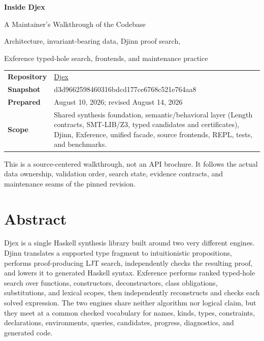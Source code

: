 \documentclass[10pt,letterpaper,oneside]{report}
\newcommand{\commitid}[1]{{\ttfamily\footnotesize #1}}
\newcommand{\RepoDjex}{\href{https://github.com/VladimirReshetnikov/Djex}{Djex}}
\begin{document}
\hypersetup{pageanchor=false}
\begin{titlepage}
\centering
\vspace*{0.8in}
{\Huge\bfseries\color{Ink} Inside Djex\par}
\vspace{0.25in}
{\LARGE\color{DeepBlue} A Maintainer's Walkthrough of the Codebase\par}
\vspace{0.2in}
{\large Architecture, invariant-bearing data, Djinn proof search,\par
Exference typed-hole search, frontends, and maintenance practice\par}
\vspace{0.8in}
\begin{tcolorbox}[width=0.86\textwidth,colback=SoftGray,colframe=RuleGray,boxrule=0.7pt,arc=1mm]
\small
\begin{tabularx}{\textwidth}{@{}L{0.18\textwidth}Y@{}}
\textbf{Repository} & \RepoDjex \\
\textbf{Snapshot} & \commitid{d3d9662598460316bdcd177ce6768c521e764aa8} \\
\textbf{Prepared} & August 10, 2026; revised August 14, 2026 \\
\textbf{Scope} & Shared synthesis foundation, semantic/behavioral layer (Length contracts, SMT-LIB/Z3, typed candidates and certificates), Djinn, Exference, unified facade, source frontends, REPL, tests, and benchmarks. \\
\end{tabularx}
\end{tcolorbox}
\vfill
\vspace{0.25in}
{\small This is a source-centered walkthrough, not an API brochure. It follows the actual data ownership, validation order, search state, evidence contracts, and maintenance seams of the pinned revision.\par}
\end{titlepage}
\clearpage
\hypersetup{pageanchor=true}
\chapter*{Abstract}

Djex is a single Haskell synthesis library built around two very different engines. Djinn translates a supported type fragment to intuitionistic propositions, performs proof-producing LJT search, independently checks the resulting proof, and lowers it to generated Haskell syntax. Exference performs ranked typed-hole search over functions, constructors, deconstructors, class obligations, substitutions, and lexical scopes, then independently reconstructs and checks each solved expression. The two engines share neither algorithm nor logical claim, but they meet at a common checked vocabulary for names, kinds, types, constraints, declarations, environments, queries, candidates, progress, diagnostics, and generated code.
\end{document}
